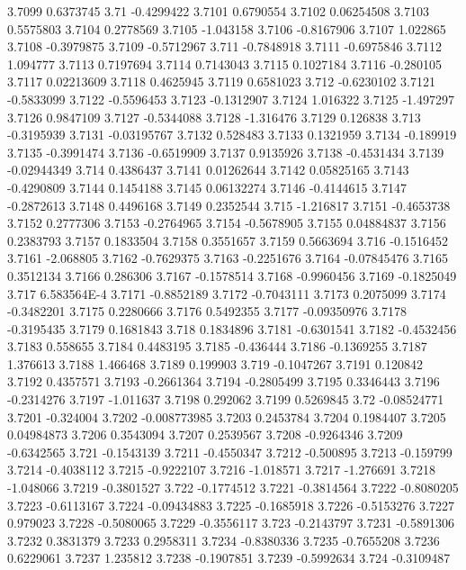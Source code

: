 3.7099  0.6373745
3.71  -0.4299422
3.7101  0.6790554
3.7102  0.06254508
3.7103  0.5575803
3.7104  0.2778569
3.7105  -1.043158
3.7106  -0.8167906
3.7107  1.022865
3.7108  -0.3979875
3.7109  -0.5712967
3.711  -0.7848918
3.7111  -0.6975846
3.7112  1.094777
3.7113  0.7197694
3.7114  0.7143043
3.7115  0.1027184
3.7116  -0.280105
3.7117  0.02213609
3.7118  0.4625945
3.7119  0.6581023
3.712  -0.6230102
3.7121  -0.5833099
3.7122  -0.5596453
3.7123  -0.1312907
3.7124  1.016322
3.7125  -1.497297
3.7126  0.9847109
3.7127  -0.5344088
3.7128  -1.316476
3.7129  0.126838
3.713  -0.3195939
3.7131  -0.03195767
3.7132  0.528483
3.7133  0.1321959
3.7134  -0.189919
3.7135  -0.3991474
3.7136  -0.6519909
3.7137  0.9135926
3.7138  -0.4531434
3.7139  -0.02944349
3.714  0.4386437
3.7141  0.01262644
3.7142  0.05825165
3.7143  -0.4290809
3.7144  0.1454188
3.7145  0.06132274
3.7146  -0.4144615
3.7147  -0.2872613
3.7148  0.4496168
3.7149  0.2352544
3.715  -1.216817
3.7151  -0.4653738
3.7152  0.2777306
3.7153  -0.2764965
3.7154  -0.5678905
3.7155  0.04884837
3.7156  0.2383793
3.7157  0.1833504
3.7158  0.3551657
3.7159  0.5663694
3.716  -0.1516452
3.7161  -2.068805
3.7162  -0.7629375
3.7163  -0.2251676
3.7164  -0.07845476
3.7165  0.3512134
3.7166  0.286306
3.7167  -0.1578514
3.7168  -0.9960456
3.7169  -0.1825049
3.717  6.583564E-4
3.7171  -0.8852189
3.7172  -0.7043111
3.7173  0.2075099
3.7174  -0.3482201
3.7175  0.2280666
3.7176  0.5492355
3.7177  -0.09350976
3.7178  -0.3195435
3.7179  0.1681843
3.718  0.1834896
3.7181  -0.6301541
3.7182  -0.4532456
3.7183  0.558655
3.7184  0.4483195
3.7185  -0.436444
3.7186  -0.1369255
3.7187  1.376613
3.7188  1.466468
3.7189  0.199903
3.719  -0.1047267
3.7191  0.120842
3.7192  0.4357571
3.7193  -0.2661364
3.7194  -0.2805499
3.7195  0.3346443
3.7196  -0.2314276
3.7197  -1.011637
3.7198  0.292062
3.7199  0.5269845
3.72  -0.08524771
3.7201  -0.324004
3.7202  -0.008773985
3.7203  0.2453784
3.7204  0.1984407
3.7205  0.04984873
3.7206  0.3543094
3.7207  0.2539567
3.7208  -0.9264346
3.7209  -0.6342565
3.721  -0.1543139
3.7211  -0.4550347
3.7212  -0.500895
3.7213  -0.159799
3.7214  -0.4038112
3.7215  -0.9222107
3.7216  -1.018571
3.7217  -1.276691
3.7218  -1.048066
3.7219  -0.3801527
3.722  -0.1774512
3.7221  -0.3814564
3.7222  -0.8080205
3.7223  -0.6113167
3.7224  -0.09434883
3.7225  -0.1685918
3.7226  -0.5153276
3.7227  0.979023
3.7228  -0.5080065
3.7229  -0.3556117
3.723  -0.2143797
3.7231  -0.5891306
3.7232  0.3831379
3.7233  0.2958311
3.7234  -0.8380336
3.7235  -0.7655208
3.7236  0.6229061
3.7237  1.235812
3.7238  -0.1907851
3.7239  -0.5992634
3.724  -0.3109487
